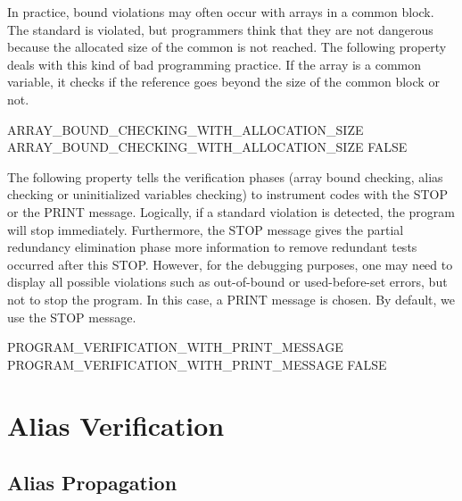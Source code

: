 \documentclass[a4paper]{report}
\begin{document}
In practice, bound violations may often occur with arrays in a common block. The
standard is violated, but programmers think that they are not dangerous
because the allocated size of the common is not reached.
The following property deals with this kind of bad programming practice. If the
array is a common variable, it checks if the reference goes beyond the
size of the common block or not.

\begin{PipsProp}{ARRAY_BOUND_CHECKING_WITH_ALLOCATION_SIZE}
ARRAY_BOUND_CHECKING_WITH_ALLOCATION_SIZE FALSE
\end{PipsProp}

The following property tells the verification phases (array bound
checking, alias checking or uninitialized variables checking) to instrument
codes with the STOP or the PRINT message. Logically, if a standard violation
is detected, the program will stop immediately. Furthermore, the STOP message gives the
partial redundancy elimination phase more information to remove
redundant tests occurred after this STOP. However, for the debugging
purposes, one may need to display all possible violations such as
out-of-bound or used-before-set errors, but not
to stop the program. In this case, a PRINT message is chosen. By default,
we use the STOP message.

\begin{PipsProp}{PROGRAM_VERIFICATION_WITH_PRINT_MESSAGE}
PROGRAM_VERIFICATION_WITH_PRINT_MESSAGE FALSE
\end{PipsProp}



\section{Alias Verification}
\label{subsection-alias-verification}

\subsection{Alias Propagation}
\label{subsubsection-alias-propagation}
\end{document}
